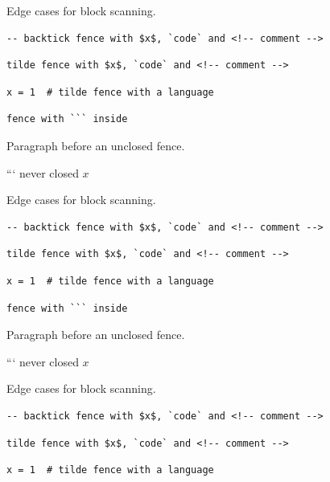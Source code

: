 Edge cases for block scanning.

\begin{verbatim}
-- backtick fence with $x$, `code` and <!-- comment -->
\end{verbatim}

\begin{verbatim}
tilde fence with $x$, `code` and <!-- comment -->
\end{verbatim}

\begin{verbatim}
x = 1  # tilde fence with a language
\end{verbatim}

\begin{verbatim}
fence with ``` inside
\end{verbatim}

Paragraph before an unclosed fence.

```
never closed $x$ %

Edge cases for block scanning.

\begin{verbatim}
-- backtick fence with $x$, `code` and <!-- comment -->
\end{verbatim}

\begin{verbatim}
tilde fence with $x$, `code` and <!-- comment -->
\end{verbatim}

\begin{verbatim}
x = 1  # tilde fence with a language
\end{verbatim}

\begin{verbatim}
fence with ``` inside
\end{verbatim}

Paragraph before an unclosed fence.

```
never closed $x$ %

Edge cases for block scanning.

\begin{verbatim}
-- backtick fence with $x$, `code` and <!-- comment -->
\end{verbatim}

\begin{verbatim}
tilde fence with $x$, `code` and <!-- comment -->
\end{verbatim}

\begin{verbatim}
x = 1  # tilde fence with a language
\end{verbatim}


